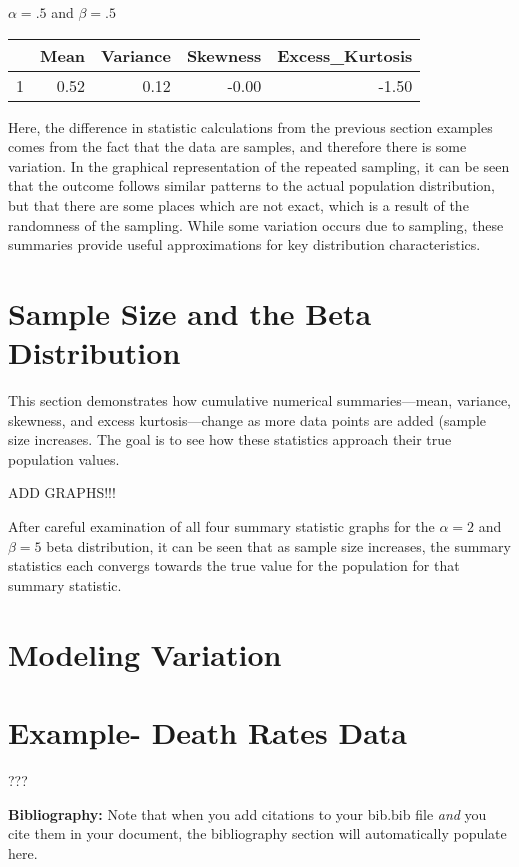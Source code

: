 \documentclass{article}\usepackage[]{graphicx}\usepackage[]{xcolor}
\begin{document}
\begin{multicols}{2}
$\alpha = .5$ and $\beta = .5$
\begin{table}[H]
\centering
\begin{tabular}{rrrrr}
  \hline
 & Mean & Variance & Skewness & Excess\_Kurtosis \\ 
  \hline
1 & 0.52 & 0.12 & -0.00 & -1.50 \\ 
   \hline
\end{tabular}
\end{table}

Here, the difference in statistic calculations from the previous section examples comes from the fact that the data are samples, and therefore there is some variation. In the graphical representation of the repeated sampling, it can be seen that the outcome follows similar patterns to the actual population distribution, but that there are some places which are not exact, which is a result of the randomness of the sampling. While some variation occurs due to sampling, these summaries provide useful approximations for key distribution characteristics.

\section{Sample Size and the Beta Distribution}
This section demonstrates how cumulative numerical summaries—mean, variance, skewness, and excess kurtosis—change as more data points are added (sample size increases. The goal is to see how these statistics approach their true population values.

ADD GRAPHS!!!

After careful examination of all four summary statistic graphs for the $\alpha=2$ and $\beta=5$ beta distribution, it can be seen that as sample size increases, the summary statistics each convergs towards the true value for the population for that summary statistic.

\section{Modeling Variation}







\section{Example- Death Rates Data}
???
\vspace{2em}

\noindent\textbf{Bibliography:} Note that when you add citations to your bib.bib file \emph{and}
you cite them in your document, the bibliography section will automatically populate here.

\begin{tiny}

\end{tiny}
\end{multicols}
\end{document}
